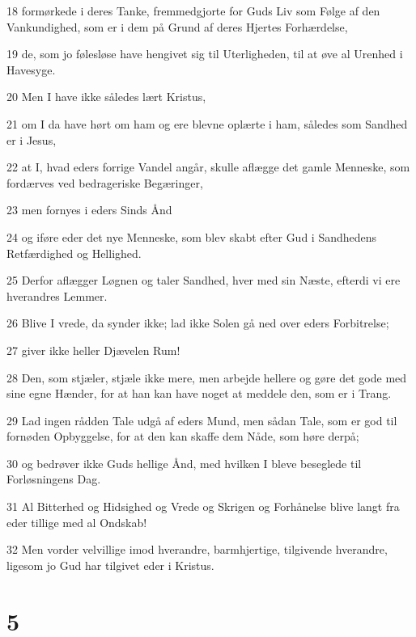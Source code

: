 \par 18 formørkede i deres Tanke, fremmedgjorte for Guds Liv som Følge af den Vankundighed, som er i dem på Grund af deres Hjertes Forhærdelse,
\par 19 de, som jo følesløse have hengivet sig til Uterligheden, til at øve al Urenhed i Havesyge.
\par 20 Men I have ikke således lært Kristus,
\par 21 om I da have hørt om ham og ere blevne oplærte i ham, således som Sandhed er i Jesus,
\par 22 at I, hvad eders forrige Vandel angår, skulle aflægge det gamle Menneske, som fordærves ved bedrageriske Begæringer,
\par 23 men fornyes i eders Sinds Ånd
\par 24 og iføre eder det nye Menneske, som blev skabt efter Gud i Sandhedens Retfærdighed og Hellighed.
\par 25 Derfor aflægger Løgnen og taler Sandhed, hver med sin Næste, efterdi vi ere hverandres Lemmer.
\par 26 Blive I vrede, da synder ikke; lad ikke Solen gå ned over eders Forbitrelse;
\par 27 giver ikke heller Djævelen Rum!
\par 28 Den, som stjæler, stjæle ikke mere, men arbejde hellere og gøre det gode med sine egne Hænder, for at han kan have noget at meddele den, som er i Trang.
\par 29 Lad ingen rådden Tale udgå af eders Mund, men sådan Tale, som er god til fornøden Opbyggelse, for at den kan skaffe dem Nåde, som høre derpå;
\par 30 og bedrøver ikke Guds hellige Ånd, med hvilken I bleve beseglede til Forløsningens Dag.
\par 31 Al Bitterhed og Hidsighed og Vrede og Skrigen og Forhånelse blive langt fra eder tillige med al Ondskab!
\par 32 Men vorder velvillige imod hverandre, barmhjertige, tilgivende hverandre, ligesom jo Gud har tilgivet eder i Kristus.

\chapter{5}

